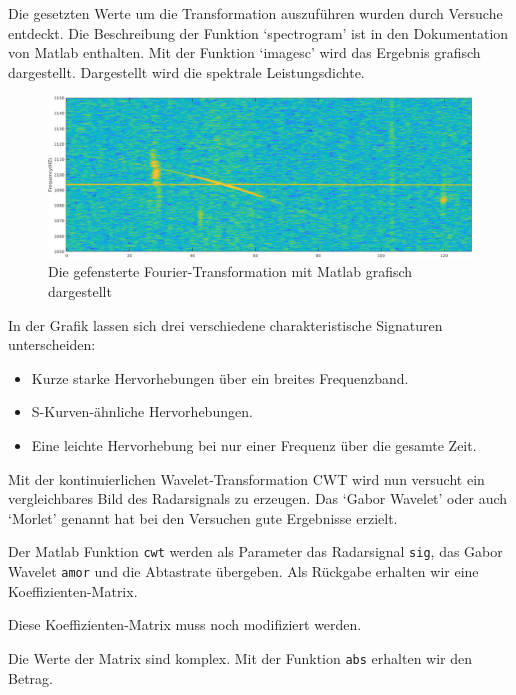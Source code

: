 \begin{refsection}
Die gesetzten Werte um die Transformation auszuführen wurden durch Versuche entdeckt. 
Die Beschreibung der Funktion `spectrogram' ist in den Dokumentation von Matlab enthalten.
Mit der Funktion `imagesc' wird das Ergebnis grafisch dargestellt.
Dargestellt wird die spektrale Leistungsdichte.

\begin{figure}
	\centering
	\includegraphics[width=\linewidth]{papers/meteor/images/signal_gfft-clipped.png}
	\caption{Die gefensterte Fourier-Transformation mit Matlab grafisch dargestellt}
	\label{fig:signalmitgfft}
\end{figure}
In der Grafik lassen sich drei verschiedene charakteristische Signaturen unterscheiden:
\begin{itemize}
	\item Kurze starke Hervorhebungen über ein breites Frequenzband.
	\item S-Kurven-ähnliche  Hervorhebungen.
	\item Eine leichte Hervorhebung bei nur einer Frequenz über die gesamte Zeit.
\end{itemize}
 
Mit der kontinuierlichen Wavelet-Transformation CWT wird nun versucht ein vergleichbares Bild des Radarsignals zu erzeugen.
Das `Gabor Wavelet' oder auch `Morlet' genannt hat bei den Versuchen gute Ergebnisse erzielt.

Der Matlab Funktion \texttt{cwt} werden als Parameter das Radarsignal {\texttt{sig}}, das Gabor Wavelet {\texttt{amor}} und die Abtastrate übergeben.
Als Rückgabe erhalten wir eine Koeffizienten-Matrix.

Diese Koeffizienten-Matrix muss noch modifiziert werden.

Die Werte der Matrix sind komplex.
Mit der Funktion \texttt{abs} erhalten wir den Betrag.


\end{refsection}

